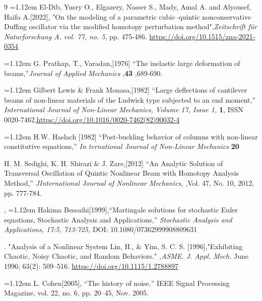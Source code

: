 \documentclass{ws-ijbc}
\begin{document}
\begin{thebibliography}{9}
\hangindent=1.12em El-Dib, Yusry O., Elgazery, Nasser S., Mady, Amal A. and Alyousef, Haifa A.[2022], "On the modeling of a parametric cubic–quintic nonconservative Duffing oscillator via the modified homotopy perturbation method",{\it Zeitschrift für Naturforschung A, vol. 77, no. 5}, pp. 475-486. \url{https://doi.org/10.1515/zna-2021-0354}


\hangindent=1.12em G. Prathap, T., Varadan,[1976] ``The inelastic large deformation of
beams,''{\it Journal of Applied Mechanics } ,{\bf43} ,689-690.

\hangindent=1.12em Gilbert Lewis \& Frank Monasa,[1982] ``Large deflections of cantilever beams of non-linear materials of the Ludwick type subjected to an end moment,'' {\it International Journal of Non-Linear Mechanics,
Volume 17, Issue 1, } {\bf 1},
ISSN 0020-7462,\url{https://doi.org/10.1016/0020-7462(82)90032-4}


\hangindent=1.12em H.W. Haslach [1982] ``Post-buckling behavior of columns with non-linear
constitutive equations,'' {\it  In ternational Journal of Non-Linear Mechanics} {\bf 20}


H. M. Sedighi, K. H. Shirazi \& J. Zare,[2012] “An Analytic Solution of Transversal Oscillation of Quintic Nonlinear Beam with Homotopy Analysis Method,” {\it JInternational Journal of Nonlinear Mechanics, },Vol. 47, No. 10, 2012, pp. 777-784.


, 
\hangindent=1.12em Hakima Bessaihi[1999],“Martingale solutions for stochastic Euler equations, Stochastic Analysis and Applications,” {\it Stochastic Analysis and Applications, 17:5, 713-725,} DOI: 10.1080/07362999908809631



. "Analysis of a Nonlinear System Lin, H., \& Yim, S. C. S. [1996],"Exhibiting Chaotic, Noisy Chaotic, and Random Behaviors." ,{\it ASME. J. Appl. Mech.} June 1996; 63(2): 509–516. \url{https://doi.org/10.1115/1.2788897}


\hangindent=1.12em L. Cohen[2005], “The history of noise,” IEEE Signal Processing Magazine, vol. 22, no. 6, pp. 20–45,
Nov. 2005.



\end{thebibliography}
\end{document}
